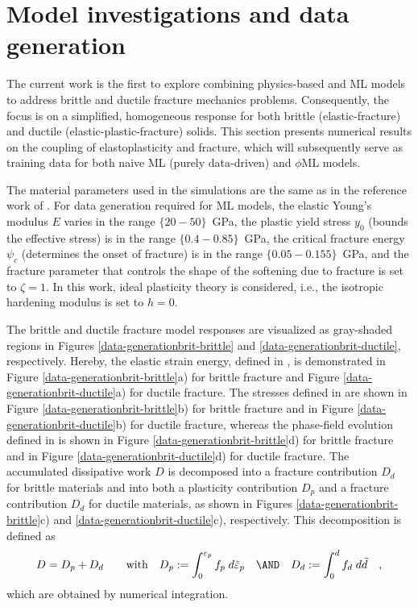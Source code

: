 \documentclass[final,3p,times]{elsarticle}
\begin{document}
\section{Model investigations and data generation}
\label{sec3}

The current work is the first to explore combining physics-based and ML models to address brittle and ductile fracture mechanics problems. Consequently, the focus is on a simplified, homogeneous response for both brittle (elastic-fracture) and ductile (elastic-plastic-fracture) solids. 
This section presents numerical results on the coupling of elastoplasticity and fracture, which will subsequently serve as training data for both naive ML (purely data-driven) and $\phi$ML models.


The material parameters used in the simulations are the same as in the reference work of \cite{miehe+aldakheel+raina16}. For data generation required for ML models, the elastic Young's modulus $E$ varies in the range $\{20 - 50\}$~GPa, the plastic yield stress $y_0$ (bounds the effective stress) is in the range $\{0.4 - 0.85\}$~GPa, the critical fracture energy $\psi_c$ (determines the onset of fracture) is in the range $\{0.05 - 0.155\}$~GPa, and the fracture parameter that controls the shape of the softening due to fracture is set to $\zeta=1$. In this work, ideal plasticity theory is considered, i.e., the isotropic hardening modulus is set to $h=0$. 

The brittle and ductile fracture model responses are visualized as gray-shaded regions in Figures \ref{data-generationbrit-brittle} and \ref{data-generationbrit-ductile}, respectively. Hereby, the elastic strain energy, defined in , is demonstrated in Figure \ref{data-generationbrit-brittle}a) for brittle fracture and Figure \ref{data-generationbrit-ductile}a) for ductile fracture. The stresses defined in  are shown in Figure \ref{data-generationbrit-brittle}b) for brittle fracture and in Figure \ref{data-generationbrit-ductile}b) for ductile fracture, whereas the phase-field evolution defined in  is shown in Figure \ref{data-generationbrit-brittle}d) for brittle fracture and in Figure \ref{data-generationbrit-ductile}d) for ductile fracture. 
The accumulated dissipative work $D$ is decomposed into a fracture contribution $D_d$ for brittle materials and into both a plasticity contribution $D_p$ and a fracture contribution $D_d$ for ductile materials, as shown in Figures \ref{data-generationbrit-brittle}c) and \ref{data-generationbrit-ductile}c), respectively. This decomposition is defined as 
%
\begin{equation}
D= D_p  + D_d 
\qquad
\mbox{with}
\quad
D_p := \int_0^{\varepsilon_p} f_p  \; d \tilde\varepsilon_p 
\quad \AND \quad
D_d := \int_0^d f_d  \; d \tilde{d} \quad ,
\end{equation}
which are obtained by numerical integration.
%
\end{document}
